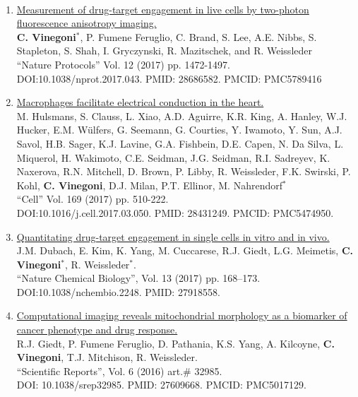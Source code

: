 \documentclass{resume}
\begin{document}
\begin{category}{~~}
\begin{enumerate}
\item
\href{https://tinyurl.com/te7uwuyv}{Measurement of drug-target engagement in live cells by two-photon fluorescence anisotropy imaging.}\\
{\bf C. Vinegoni$^*$}, P. Fumene Feruglio, C. Brand, S. Lee, A.E. Nibbs, S. Stapleton, S. Shah, I. Gryczynski, R. Mazitschek, and R. Weissleder \\
``Nature Protocols''  Vol. 12 (2017) pp. 1472-1497. \\DOI:10.1038/nprot.2017.043. PMID: 28686582. PMCID: PMC5789416 

\item
\href{https://tinyurl.com/8exdu6w}{Macrophages facilitate electrical conduction in the heart.}\\
M. Hulsmans, S. Clauss, L. Xiao, A.D. Aguirre, K.R. King, A. Hanley, W.J. Hucker, E.M. Wülfers, G. Seemann, G. Courties, Y. Iwamoto, Y. Sun, A.J. Savol, H.B. Sager, K.J. Lavine, G.A. Fishbein, D.E. Capen, N. Da Silva, L. Miquerol, H. Wakimoto, C.E. Seidman, J.G. Seidman, R.I. Sadreyev, K. Naxerova, R.N. Mitchell, D. Brown, P. Libby, R. Weissleder, F.K. Swirski, P. Kohl, {\bf C. Vinegoni}, D.J. Milan, P.T. Ellinor, M. Nahrendorf$^*$ \\
``Cell''  Vol. 169 (2017) pp. 510-222. \\DOI:10.1016/j.cell.2017.03.050. PMID: 28431249. PMCID: PMC5474950.

\item
\href{https://tinyurl.com/2py4t3nn}{Quantitating drug-target engagement in single cells in vitro and in vivo.}\\
J.M. Dubach, E. Kim, K. Yang, M. Cuccarese, R.J. Giedt, L.G. Meimetis, {\bf C. Vinegoni$^*$}, R. Weissleder$^*$.\\
 ``Nature Chemical Biology'', Vol. 13 (2017) pp. 168--173. \\DOI:10.1038/nchembio.2248. PMID: 27918558.

\item
\href{https://tinyurl.com/3hj8uvwe}{Computational imaging reveals mitochondrial morphology as a biomarker of cancer phenotype and drug response.}\\
R.J. Giedt, P. Fumene Feruglio, D. Pathania, K.S. Yang, A. Kilcoyne, {\bf C. Vinegoni}, T.J. Mitchison, R. Weissleder.\\
 ``Scientific Reports'', Vol. 6 (2016) art.$\#$ 32985. \\DOI: 10.1038/srep32985. PMID: 27609668. PMCID: PMC5017129.


\end{enumerate}
\end{category}
\end{document}
